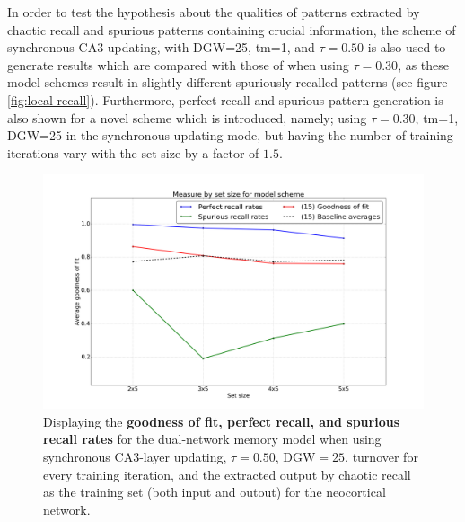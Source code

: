 
In order to test the hypothesis about the qualities of patterns extracted by chaotic recall and spurious patterns containing crucial information, the scheme of synchronous CA3-updating, with DGW=25, tm=1, and $\tau=0.50$ is also used to generate results which are compared with those of when using $\tau=0.30$, as these model schemes result in slightly different spuriously recalled patterns (see figure \ref{fig:local-recall}). Furthermore, perfect recall and spurious pattern generation is also shown for a novel scheme which is introduced, namely; using $\tau=0.30$, tm=1, DGW=25 in the synchronous updating mode, but having the number of training iterations vary with the set size by a factor of $1.5$.



\begin{figure}
    \centering
    \includegraphics[width=13cm]{fig/hypothesis-test-sync/combined-measures-sync-tr50-tm1-dgw25}
    \caption{Displaying the \textbf{goodness of fit, perfect recall, and spurious recall rates} for the dual-network memory model when using synchronous CA3-layer updating, $\tau=0.50$, DGW$=25$, turnover for every training iteration, and the extracted output by chaotic recall as the training set (both input and outout) for the neocortical network.}
    \label{fig:combined-measures-sync-tr50-tm1-dgw25}
\end{figure}

